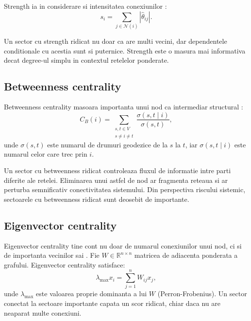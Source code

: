 Strength ia in considerare si intensitatea conexiunilor \citep{newman2010}:
\begin{equation}
    s_i = \sum_{j \in \mathcal{N}(i)} |\hat{\theta}_{ij}|.
    \label{eq:strength}
\end{equation}

Un sector cu strength ridicat nu doar ca are multi vecini, dar dependentele
conditionale cu acestia sunt si puternice. Strength este o masura mai informativa
decat degree-ul simplu in contextul retelelor ponderate.

\subsection{Betweenness centrality}

Betweenness centrality masoara importanta unui nod ca intermediar structural
\citep{freeman1977}:
\begin{equation}
    C_B(i) = \sum_{\substack{s,t \in V \\ s \neq i \neq t}}
    \frac{\sigma(s,t \mid i)}{\sigma(s,t)},
    \label{eq:betweenness}
\end{equation}
unde $\sigma(s,t)$ este numarul de drumuri geodezice de la $s$ la $t$, iar
$\sigma(s,t \mid i)$ este numarul celor care trec prin $i$.

Un sector cu betweenness ridicat controleaza fluxul de informatie intre parti
diferite ale retelei. Eliminarea unui astfel de nod ar fragmenta reteaua si
ar perturba semnificativ conectivitatea sistemului. Din perspectiva riscului
sistemic, sectoarele cu betweenness ridicat sunt deosebit de importante.

\subsection{Eigenvector centrality}

Eigenvector centrality tine cont nu doar de numarul conexiunilor unui nod,
ci si de importanta vecinilor sai \citep{bonacich1987}. Fie $W \in \mathbb{R}^{n \times n}$ matricea
de adiacenta ponderata a grafului. Eigenvector centrality satisface:
\begin{equation}
    \lambda_{\max} x_i = \sum_{j=1}^n W_{ij} x_j,
    \label{eq:eigenvector}
\end{equation}
unde $\lambda_{\max}$ este valoarea proprie dominanta a lui $W$ (Perron-Frobenius).
Un sector conectat la sectoare importante capata un scor ridicat, chiar daca
nu are neaparat multe conexiuni.

